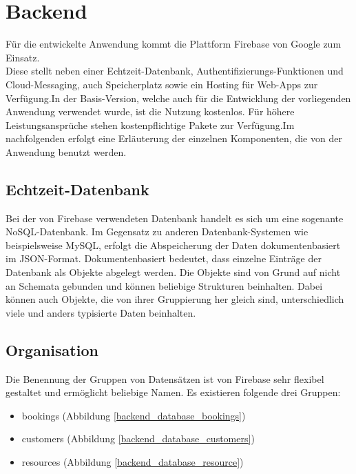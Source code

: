 \chapter{Backend}
Für die entwickelte Anwendung kommt die Plattform \glqq Firebase\grqq{} von Google zum Einsatz.
\\
Diese stellt neben einer Echtzeit-Datenbank, Authentifizierungs-Funktionen und Cloud-Messaging, auch Speicherplatz sowie ein Hosting für Web-Apps zur Verfügung.In der Basis-Version, welche auch für die Entwicklung der vorliegenden Anwendung verwendet wurde, ist die Nutzung kostenlos. Für höhere Leistungsansprüche stehen kostenpflichtige Pakete zur Verfügung.Im nachfolgenden erfolgt eine Erläuterung der einzelnen Komponenten, die von der Anwendung benutzt werden.

\section{Echtzeit-Datenbank}
Bei der von Firebase verwendeten Datenbank handelt es sich um eine sogenante NoSQL-Datenbank. Im Gegensatz zu anderen Datenbank-Systemen wie beispielsweise MySQL, erfolgt die Abspeicherung der Daten dokumentenbasiert im JSON-Format.
Dokumentenbasiert bedeutet, dass einzelne Einträge der Datenbank als Objekte abgelegt werden. Die Objekte sind von Grund auf nicht an Schemata gebunden und können beliebige Strukturen beinhalten.
Dabei können auch Objekte, die von ihrer Gruppierung her gleich sind, unterschiedlich viele und anders typisierte Daten beinhalten.\\

\section{Organisation}
Die Benennung der Gruppen von Datensätzen ist von Firebase sehr flexibel gestaltet und ermöglicht beliebige Namen.
Es existieren folgende drei Gruppen:
\begin{itemize}
\item bookings (Abbildung \ref{backend_database_bookings})
\item customers (Abbildung \ref{backend_database_customers})
\item resources (Abbildung \ref{backend_database_resource})
\end{itemize}

